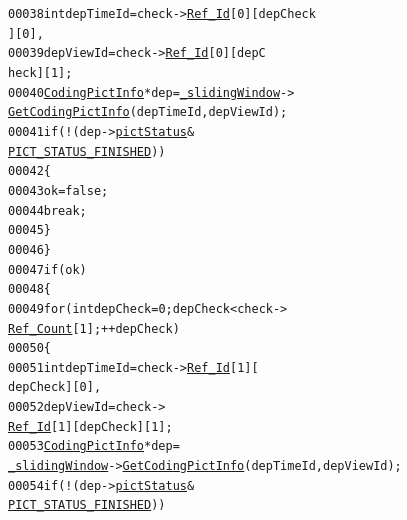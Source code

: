 \begin{footnotesize}
\begin{alltt}
00038                                         \textcolor{keywordtype}{int} depTimeId = check->\hyperlink{struct_coding_pict_info_a37079a7e9c26b338a6978063f471a82f}{Ref_Id}[0][depCheck
      ][0],
00039                                                 depViewId = check->\hyperlink{struct_coding_pict_info_a37079a7e9c26b338a6978063f471a82f}{Ref_Id}[0][depC
      heck][1];
00040                                         \hyperlink{struct_coding_pict_info}{CodingPictInfo} *dep = \hyperlink{class_a_frame_controller_aca7790494d5c5d114171269ddaabd568}{_slidingWindow}->
      \hyperlink{class_sliding_window_ac50874323a2aaa4ef76fab47f80c9f92}{GetCodingPictInfo}(depTimeId, depViewId);
00041                                         \textcolor{keywordflow}{if} (!(dep->\hyperlink{struct_coding_pict_info_a41498e5ba764405481005e6569d7f728}{pictStatus}&
      \hyperlink{_picture_info_8h_a170d5962358e97425e08d5646653494b}{PICT_STATUS_FINISHED}))
00042                                         \{
00043                                                 ok = \textcolor{keyword}{false};
00044                                                 \textcolor{keywordflow}{break};
00045                                         \}
00046                                 \}
00047                                 \textcolor{keywordflow}{if} (ok)
00048                                 \{
00049                                         \textcolor{keywordflow}{for} (\textcolor{keywordtype}{int} depCheck = 0; depCheck < check->
      \hyperlink{struct_coding_pict_info_ab48541faa825385baeca833ffe98b3d4}{Ref_Count}[1]; ++depCheck)
00050                                         \{
00051                                                 \textcolor{keywordtype}{int} depTimeId = check->\hyperlink{struct_coding_pict_info_a37079a7e9c26b338a6978063f471a82f}{Ref_Id}[1][
      depCheck][0],
00052                                                         depViewId = check->
      \hyperlink{struct_coding_pict_info_a37079a7e9c26b338a6978063f471a82f}{Ref_Id}[1][depCheck][1];
00053                                                 \hyperlink{struct_coding_pict_info}{CodingPictInfo} *dep = 
      \hyperlink{class_a_frame_controller_aca7790494d5c5d114171269ddaabd568}{_slidingWindow}->\hyperlink{class_sliding_window_ac50874323a2aaa4ef76fab47f80c9f92}{GetCodingPictInfo}(depTimeId, depViewId);
00054                                                 \textcolor{keywordflow}{if} (!(dep->\hyperlink{struct_coding_pict_info_a41498e5ba764405481005e6569d7f728}{pictStatus}&
      \hyperlink{_picture_info_8h_a170d5962358e97425e08d5646653494b}{PICT_STATUS_FINISHED}))

\end{alltt}
\end{footnotesize}
